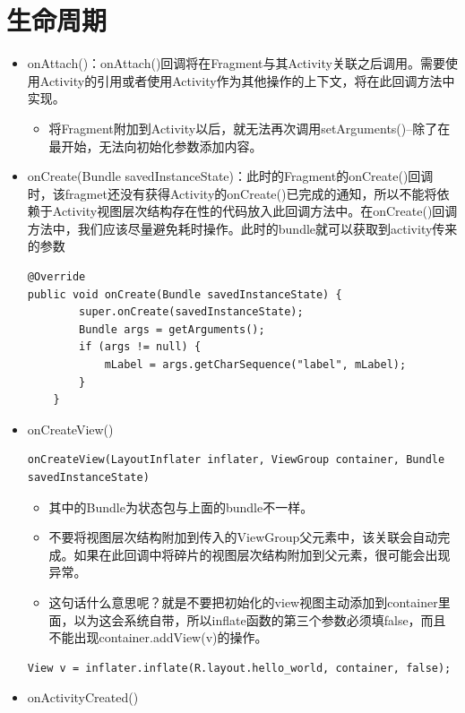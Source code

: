 \documentclass[9pt, b5paaper]{book}
\begin{document}
\section{生命周期}
\label{sec-2-2}
\begin{itemize}
\item onAttach()：onAttach()回调将在Fragment与其Activity关联之后调用。需要使用Activity的引用或者使用Activity作为其他操作的上下文，将在此回调方法中实现。
\begin{itemize}
\item 将Fragment附加到Activity以后，就无法再次调用setArguments()--除了在最开始，无法向初始化参数添加内容。
\end{itemize}
\item onCreate(Bundle savedInstanceState)：此时的Fragment的onCreate()回调时，该fragmet还没有获得Activity的onCreate()已完成的通知，所以不能将依赖于Activity视图层次结构存在性的代码放入此回调方法中。在onCreate()回调方法中，我们应该尽量避免耗时操作。此时的bundle就可以获取到activity传来的参数
\begin{verbatim}
@Override
public void onCreate(Bundle savedInstanceState) {  
        super.onCreate(savedInstanceState);  
        Bundle args = getArguments();  
        if (args != null) {  
            mLabel = args.getCharSequence("label", mLabel);  
        }  
    }
\end{verbatim}
\item onCreateView()
\begin{verbatim}
onCreateView(LayoutInflater inflater, ViewGroup container, Bundle savedInstanceState)
\end{verbatim}
\begin{itemize}
\item 其中的Bundle为状态包与上面的bundle不一样。
\item 不要将视图层次结构附加到传入的ViewGroup父元素中，该关联会自动完成。如果在此回调中将碎片的视图层次结构附加到父元素，很可能会出现异常。
\item 这句话什么意思呢？就是不要把初始化的view视图主动添加到container里面，以为这会系统自带，所以inflate函数的第三个参数必须填false，而且不能出现container.addView(v)的操作。
\end{itemize}
\begin{verbatim}
View v = inflater.inflate(R.layout.hello_world, container, false);
\end{verbatim}
\item onActivityCreated()

\end{itemize}
\end{document}
